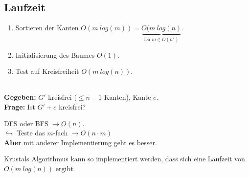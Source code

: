 \subsection*{Laufzeit}
\begin{enumerate}
	\item Sortieren der Kanten $O(m~log(m)) = \underbrace{O(m~log(n)}_{\text{Da } m \in O(n^2)}$.
	\item Initialisierung des Baumes $O(1)$.
	\item Test auf Kreisfreiheit $O(m~log(n))$.
\end{enumerate}
\begin{problem}~\\[5pt]
	\hspace*{10pt}\textbf{Gegeben: } $G'$ kreisfrei ($\le n-1$ Kanten), Kante $e$.\\[5pt]
	\hspace*{10pt}\textbf{Frage: } Ist $G' + e$ kreisfrei?
\end{problem}
DFS oder BFS $\to O(n)$.\\
$\hookrightarrow$ Teste das $m$-fach $\to O(n\cdot m)$\\
\textbf{Aber} mit anderer Implementierung geht es besser.
\begin{satz}
	Krustals Algorithmus kann so implementiert werden, dass sich eine Laufzeit von $O(m~log(n))$ ergibt.
\end{satz}
